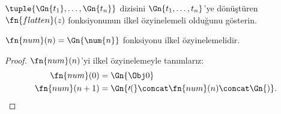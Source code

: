 \documentclass[../../../include/open-logic-section]{subfiles}
\begin{document}
\begin{prob}
$\tuple{\Gn{t_1},\dots,\Gn{t_n}}$ dizisini $\Gn{t_1,\dots,t_n}$'ye
dönüştüren $\fn{flatten}(z)$ fonksiyonunun ilkel özyinelemeli olduğunu
gösterin.
\end{prob}

\begin{prop}
  $\fn{num}(n)=\Gn{\num{n}}$ fonksiyonu ilkel özyinelemelidir.
\end{prop}

\begin{proof}
  $\fn{num}(n)$'yi ilkel özyinelemeyle tanımlarız:
  \begin{align*}
    \fn{num}(0) & = \Gn{\Obj 0}\\
    \fn{num}(n+1) & = \Gn{\prime(} \concat \fn{num}(n) \concat \Gn{)}.
  \end{align*}
\end{proof}
\end{document}
